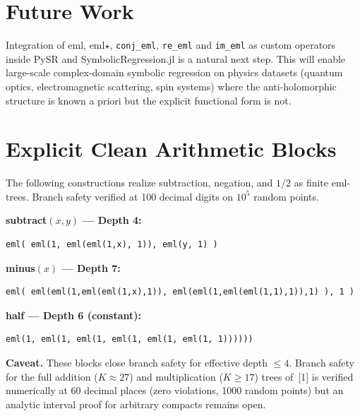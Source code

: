 \documentclass[11pt,a4paper]{article}
\begin{document}
\section{Future Work}

Integration of eml, eml$\star$, \texttt{conj\_eml}, \texttt{re\_eml} and \texttt{im\_eml} as custom operators inside PySR and SymbolicRegression.jl is a natural next step. This will enable large-scale complex-domain symbolic regression on physics datasets (quantum optics, electromagnetic scattering, spin systems) where the anti-holomorphic structure is known a priori but the explicit functional form is not.

\appendix
\section{Explicit Clean Arithmetic Blocks}

The following constructions realize subtraction, negation, and $1/2$ as finite eml-trees. Branch safety verified at 100 decimal digits on $10^5$ random points.

\textbf{subtract$(x, y)$ --- Depth 4:}
\begin{verbatim}
eml( eml(1, eml(eml(1,x), 1)), eml(y, 1) )
\end{verbatim}

\textbf{minus$(x)$ --- Depth 7:}
\begin{verbatim}
eml( eml(eml(1,eml(eml(1,x),1)), eml(eml(1,eml(eml(1,1),1)),1) ), 1 )
\end{verbatim}

\textbf{half --- Depth 6 (constant):}
\begin{verbatim}
eml(1, eml(1, eml(1, eml(1, eml(1, eml(1, 1))))))
\end{verbatim}

\textbf{Caveat.} These blocks close branch safety for effective depth $\leq 4$. Branch safety for the full addition ($K \approx 27$) and multiplication ($K \geq 17$) trees of~[1] is verified numerically at 60 decimal places (zero violations, 1000 random points) but an analytic interval proof for arbitrary compacts remains open.

\end{document}
